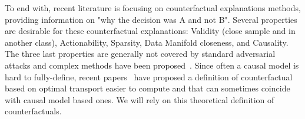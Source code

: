 To end with, recent literature is focusing on  counterfactual explanations \cite{wachter2017counterfactual,Verma20CounterfactualReview} methods, providing information on "why the decision was A and not B". Several properties are desirable for these counterfactual explanations\cite{Verma20CounterfactualReview}: Validity (close sample and in another class), Actionability, Sparsity, Data Manifold closeness, and Causality.
The three last properties are generally not covered by standard adversarial attacks and complex methods have been proposed~\cite{Goyal19counter,rodriguez21beyond,wang20scout}. %
Since often a causal model is hard to fully-define, recent papers~\cite{black19OptimTransp,deLara2021} have proposed a definition of counterfactual based on optimal transport easier to compute and that can sometimes coincide with causal model based ones. 
We will rely on this theoretical definition of counterfactuals.
